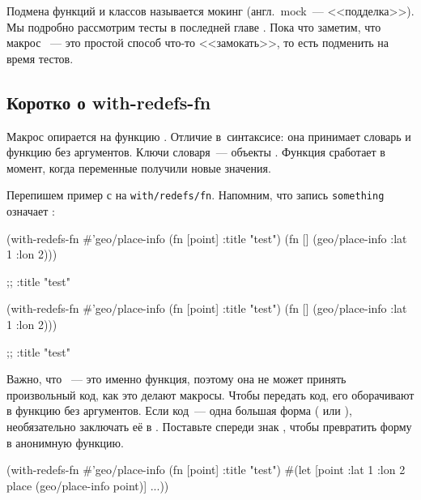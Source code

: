 \fi


Подмена функций и классов называется мокинг (англ.~mock~--- <<подделка>>). Мы
подробно рассмотрим тесты в последней главе . Пока что
заметим, что макрос ~--- это простой способ что-то <<замокать>>,
то есть подменить на время тестов.

\subsection{Коротко о with-redefs-fn}


Макрос  опирается на функцию . Отличие
в~синтаксисе: она принимает словарь и функцию без аргументов. Ключи словаря~---
объекты . Функция сработает в момент, когда переменные получили новые
значения.

Перепишем пример с  на \texttt{with\-/redefs\-/fn}. Напомним, что
запись \texttt{something} означает :

\ifnarrow

\begin{clojure}
(with-redefs-fn
  {#'geo/place-info (fn [point]
                      {:title "test"})}
  (fn []
    (geo/place-info {:lat 1 :lon 2})))

;; {:title "test"}
\end{clojure}

\else

\begin{clojure}
(with-redefs-fn
  {#'geo/place-info (fn [point] {:title "test"})}
  (fn []
    (geo/place-info {:lat 1 :lon 2})))

;; {:title "test"}
\end{clojure}

\fi


Важно, что ~--- это именно функция, поэтому она не может
принять произвольный код, как это делают макросы. Чтобы передать код, его
оборачивают в функцию без аргументов. Если код~--- одна большая форма
( или ), необязательно заключать её в
. Поставьте спереди знак \code{#}, чтобы превратить форму в
анонимную функцию.

\ifnarrow

\begin{clojure}
(with-redefs-fn
  {#'geo/place-info (fn [point]
                      {:title "test"})}
  #(let [point {:lat 1 :lon 2}
         place (geo/place-info point)]
     ...))
\end{clojure}

